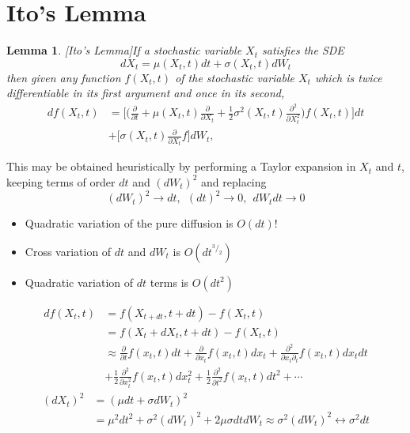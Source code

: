 \documentclass[a4 paper, 12pt]{report}
\newcommand*\rfrac[2]{{}^{#1}\!/_{#2}}
\theoremstyle{plain}
\newtheorem{lemma}[theorem]{\textbf{Lemma}}
\begin{document}
\section{Ito's Lemma}
\begin{lemma}\cite[pg.~03]{guo2011small}[Ito's Lemma]\label{L1.5}
If a stochastic variable $X_t$ satisfies the SDE
$$
dX_t = \mu(X_t,t)dt+\sigma(X_t,t)dW_t
$$
then given any function $f(X_t,t)$ of the stochastic variable $X_t$ which is twice differentiable in its first argument and once in its second,
\begin{align*}
df(X_t,t)& = \bigg[\bigg(\frac{\partial}{\partial t}+\mu(X_t,t)\frac{\partial}{\partial X_t}+\frac{1}{2}\sigma^2(X_t,t)\frac{\partial^2}{\partial X_t^2}\bigg)f(X_t,t)\bigg]dt\\
&+\bigg[\sigma(X_t,t)\frac{\partial}{\partial X_t}f\bigg]dW_t,
\end{align*}
\end{lemma}
This may be obtained heuristically by performing a Taylor expansion in $X_t$ and $t$, keeping terms of order $dt$ and $(dW_t)^2$ and replacing
$$
(dW_t)^2\rightarrow dt,~~(dt)^2\rightarrow 0,~~ dW_tdt\rightarrow 0
$$
\begin{itemize}
\item Quadratic variation of the pure diffusion is $O(dt)!$
\item Cross variation of $dt$ and $dW_t$ is $O(dt^{\rfrac{3}{2}})$
\item Quadratic variation of $dt$ terms is $O(dt^2)$
\end{itemize}
\begin{align*}
df(X_t,t)& = f(X_{t+dt},t+dt) - f(X_t,t)\\
& = f(X_t+dX_t,t+dt)-f(X_t,t)\\
&\approx \frac{\partial}{\partial t}f(x_t,t)dt+\frac{\partial}{\partial x_t}f(x_t,t)dx_t+\frac{\partial^2}{\partial x_t\partial_t}f(x_t,t)dx_tdt\\
&+\frac{1}{2}\frac{\partial^2}{\partial x_t^2}f(x_t,t)dx_t^2+\frac{1}{2}\frac{\partial^2}{\partial t^2}f(x_t,t)dt^2+\cdots
\end{align*}
\begin{align*}
(dX_t)^2& = (\mu dt+\sigma dW_t)^2\\
& = \mu^2dt^2+\sigma^2(dW_t)^2+2\mu\sigma dtdW_t\approx \sigma^2(dW_t)^2\leftrightarrow\sigma^2dt
\end{align*}
\end{document}
